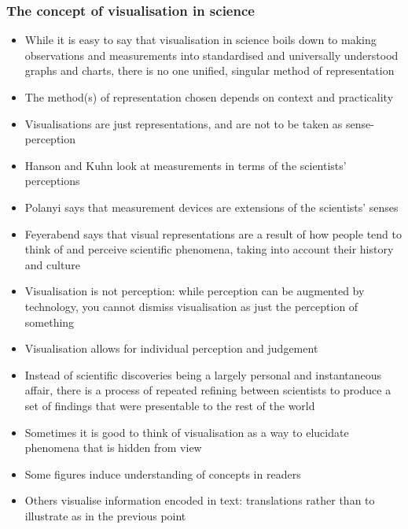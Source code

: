 \documentclass[a4paper]{article}
\begin{document}
\subsubsection{The concept of visualisation in science}
\begin{itemize}
	\item While it is easy to say that visualisation in science boils down to making observations and measurements into standardised and universally understood graphs and charts, there is no one unified, singular method of representation
	\item The method(s) of representation chosen depends on context and practicality
	\item Visualisations are just representations, and are not to be taken as sense-perception
	\item Hanson and Kuhn look at measurements in terms of the scientists’ perceptions
	\item Polanyi says that measurement devices are extensions of the scientists’ senses
	\item Feyerabend says that visual representations are a result of how people tend to think of and perceive scientific phenomena, taking into account their history and culture
	\item Visualisation is not perception: while perception can be augmented by technology, you cannot dismiss visualisation as just the perception of something
	\item Visualisation allows for individual perception and judgement
	\item Instead of scientific discoveries being a largely personal and instantaneous affair, there is a process of repeated refining between scientists to produce a set of findings that were presentable to the rest of the world
	\item Sometimes it is good to think of visualisation as a way to elucidate phenomena that is hidden from view
	\item Some figures induce understanding of concepts in readers
	\item Others visualise information encoded in text: translations rather than to illustrate as in the previous point
\end{itemize}
\end{document}
